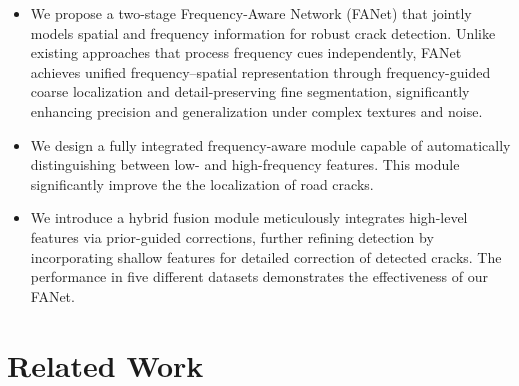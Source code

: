 \documentclass[journal]{IEEEtran}
\begin{document}
\begin{itemize}
    
    
    \item We propose a two-stage Frequency-Aware Network (FANet) that jointly models spatial and frequency information for robust crack detection. 
    Unlike existing approaches that process frequency cues independently, FANet achieves unified frequency–spatial representation through frequency-guided coarse localization and detail-preserving fine segmentation, 
    significantly enhancing precision and generalization under complex textures and noise.

    \item We design a fully integrated frequency-aware module capable of automatically distinguishing between low- and high-frequency features. This module significantly improve the the localization of road cracks.
    
    \item We introduce a hybrid fusion module meticulously integrates high-level features via prior-guided corrections, further refining detection by incorporating shallow features for detailed correction of detected cracks. The performance in five different datasets demonstrates the effectiveness of our FANet.
    
\end{itemize}


\section{Related Work}\label{sec2}
\end{document}

